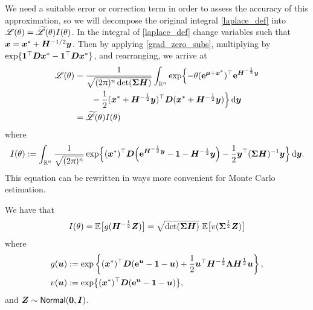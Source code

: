 We need a suitable error or correction term in order to assess the accuracy of
this approximation, so we will decompose the original integral
\eqref{laplace_def} into $\mathscr{L}(\theta) = \widetilde{\mathscr{L}}(\theta)
I(\theta)$.  In the integral of \eqref{laplace_def} change variables such that
$\bm{x} = \bm{x}^* + \bm{H}^{-1/2} \bm{y}$. Then
by applying \eqref{grad_zero_subs}, multiplying by $\exp\{\bm{1}^\top \bm{D}
\bm{x}^* - \bm{1}^\top \bm{D} \bm{x}^* \}$, and rearranging, we arrive at
\begin{align*}
	\mathscr{L}(\theta)
	&= \frac{1}{\sqrt{(2\uppi)^n\det(\bm{\Sigma} \bm{H})}}
 \int_{\mathbb{R}^n} \exp\Bigl\{ {-}\theta (\text{\bf{e}}^{\bm{\mu} + \bm{x}^*})^\top \text{\bf{e}}^{\bm{H}^{-\frac12} \bm{y}} \\ &\qquad - \frac12 (\bm{x}^* + \bm{H}^{-\frac12} \bm{y})^\top \bm{D} (\bm{x}^* + \bm{H}^{-\frac12} \bm{y}) \Bigr\}\mathop{}\!\mathrm{d} \bm{y} \\
	&= \widetilde{\mathscr{L}}(\theta) I(\theta)
\end{align*}
where
\begin{equation} \label{I_in_propos}
	I(\theta) := \int_{\mathbb{R}^n} \frac{1}{\sqrt{(2\uppi)^n}}
 \exp\Bigl\{ (\bm{x}^*)^\top \bm{D} \Bigl( \text{\bf{e}}^{\bm{H}^{-\frac12} \bm{y}} - \bm{1} - \bm{H}^{-\frac12} \bm{y} \Bigr) - \frac12 \bm{y}^\top (\bm{\Sigma} \bm{H})^{-1} \bm{y} \Bigr\} \mathop{}\!\mathrm{d} \bm{y}.
\end{equation}
This equation can be rewritten in
ways more convenient for Monte Carlo estimation.

\begin{proposition} \label{value_of_I}
We have that
\begin{equation} \label{I_as_norm_exps}
	I(\theta) = \operatorname{{\mathbb E}}\bigl[ g(\bm{H}^{-\frac12} \bm{Z}) \bigr]
 = \sqrt{\det(\bm{\Sigma} \bm{H})} \, \operatorname{{\mathbb E}}\bigl[ v(\bm{\Sigma}^{\frac12} \bm{Z}) \bigr]
\end{equation}
where
\begin{align*}
  g(\bm{u}) &:= \exp\left\{ (\bm{x}^*)^\top \bm{D} (\text{\bf{e}}^{\bm{u}} - \bm{1} - \bm{u})
 + \frac12 \bm{u}^\top \bm{H}^{-\frac12} \bm{\Lambda} \bm{H}^{\frac12} \bm{u} \right\},\\
  v(\bm{u}) &:= \exp\bigl\{ (\bm{x}^*)^\top \bm{D} (\text{\bf{e}}^{\bm{u}} - \bm{1} - \bm{u})
  \bigr\},
\end{align*}
and $\bm{Z} \sim \mathsf{Normal}(\bm{0}, \bm{I})$.
\end{proposition}

